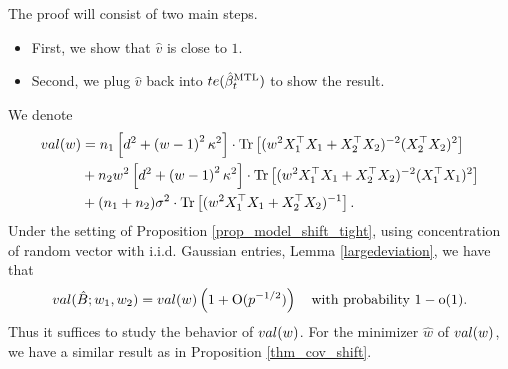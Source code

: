 The proof will consist of two main steps.
\begin{itemize}
	\item First, we show that $\hat{v}$ is close to $1$.
	\item Second, we plug $\hat{v}$ back into $te(\hat{\beta}_t^{\text{MTL}})$ to show the result.
\end{itemize}

We denote
\begin{align}
	val(w) &= n_1\left[d^2 +\left( w-1\right)^2\kappa^2\right]\cdot \operatorname{Tr}\left[( w^2X_1^{\top}X_1 +X_2^{\top}X_2)^{-2} (X_2^{\top}X_2)^2\right] \nonumber \\
	& + n_2w^2\left[d^2 +\left( w-1\right)^2\kappa^2\right]\cdot \operatorname{Tr}\left[( w^2X_1^{\top}X_1 +X_2^{\top}X_2)^{-2} (X_1^{\top}X_1)^2\right] \nonumber\\
			& + (n_1+n_2)\sigma^2 \cdot \operatorname{Tr}\left[(w^2X_1^{\top}X_1  + X_2^{\top}X_2)^{-1} \right]. \nonumber
\end{align}
Under the setting of Proposition \ref{prop_model_shift_tight}, using concentration of random vector with i.i.d. Gaussian entries, Lemma \ref{largedeviation}, we have that
$$val(\hat{B}; w_1, w_2)= val(w) \left( 1+\operatorname{O}(p^{-1/2})\right)\quad \text{with probability }1-\operatorname{o}(1).$$
Thus it suffices to study the behavior of $val (w)$.
For the minimizer $\hat w$ of $val(w)$, we have a similar result as in Proposition \ref{thm_cov_shift}.

